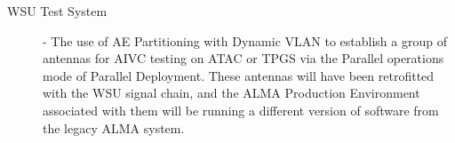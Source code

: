 \begin{description}
\item[WSU Test System] - The use of AE Partitioning with Dynamic VLAN to establish a group
of antennas for AIVC testing on ATAC or TPGS via the Parallel operations mode of Parallel Deployment.  These antennas will have been retrofitted with the WSU signal chain, and the ALMA Production Environment associated with them will be running a different version of software from the legacy ALMA system. 
\end{description}

